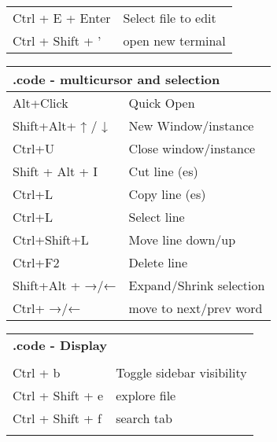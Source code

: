 \documentclass{article}
\begin{document}
\begin{landscape}
\begin{multicols*}{3}
\begin{tabular}{m{3cm}m{5cm}}
            \rowcolor{LightCyan}
            Ctrl + E + Enter         & Select file to edit       \\
            Ctrl + Shift + '         & open new terminal
        \end{tabular}
        \vspace{5pt}
        \begin{tabular}{m{3cm}m{5cm}}
            \multicolumn{2}{l}{\textbf{.code - multicursor and selection }} \\
            \hline
            Alt+Click        & Quick Open                                   \\
            \rowcolor{LightCyan}
            Shift+Alt+ ↑ / ↓ & New Window/instance                          \\
            Ctrl+U           & Close window/instance                        \\
            \rowcolor{LightCyan}
            Shift + Alt + I  & Cut line (es)                                \\
            Ctrl+L           & Copy line (es)                               \\
            \rowcolor{LightCyan}
            Ctrl+L           & Select line                                  \\
            Ctrl+Shift+L     & Move line down/up                            \\
            \rowcolor{LightCyan}
            Ctrl+F2          & Delete line                                  \\
            Shift+Alt + →/←  & Expand/Shrink selection                      \\
            \rowcolor{LightCyan}
            Ctrl+ →/←        & move to next/prev word
        \end{tabular}
        \vspace{5pt}
        \begin{tabular}{m{3cm}m{5cm}}
            \multicolumn{2}{l}{\textbf{.code - Display }       } \\                                         \\
            \hline
            Ctrl + b            & Toggle sidebar visibility      \\
            \rowcolor{LightCyan}
            Ctrl + Shift + e    & explore file                   \\
            Ctrl + Shift + f    & search tab                     \\
            \rowcolor{LightCyan}

\end{tabular}
\end{multicols*}
\end{landscape}
\end{document}
